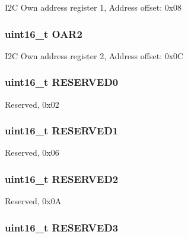 I2\-C Own address register 1, Address offset\-: 0x08 \hypertarget{struct_i2_c___type_def_a692c0f6e38cde9ec1c3c50c36aa79817}{
\subsubsection[{O\-A\-R2}]{ uint16\-\_\-t O\-A\-R2}}\label{struct_i2_c___type_def_a692c0f6e38cde9ec1c3c50c36aa79817}
I2\-C Own address register 2, Address offset\-: 0x0\-C \hypertarget{struct_i2_c___type_def_a149feba01f9c4a49570c6d88619f504f}{
\subsubsection[{R\-E\-S\-E\-R\-V\-E\-D0}]{\setlength{\rightskip}{0pt plus 5cm}uint16\-\_\-t R\-E\-S\-E\-R\-V\-E\-D0}}\label{struct_i2_c___type_def_a149feba01f9c4a49570c6d88619f504f}
Reserved, 0x02 \hypertarget{struct_i2_c___type_def_a8249a3955aace28d92109b391311eb30}{
\subsubsection[{R\-E\-S\-E\-R\-V\-E\-D1}]{\setlength{\rightskip}{0pt plus 5cm}uint16\-\_\-t R\-E\-S\-E\-R\-V\-E\-D1}}\label{struct_i2_c___type_def_a8249a3955aace28d92109b391311eb30}
Reserved, 0x06 \hypertarget{struct_i2_c___type_def_a5573848497a716a9947fd87487709feb}{
\subsubsection[{R\-E\-S\-E\-R\-V\-E\-D2}]{\setlength{\rightskip}{0pt plus 5cm}uint16\-\_\-t R\-E\-S\-E\-R\-V\-E\-D2}}\label{struct_i2_c___type_def_a5573848497a716a9947fd87487709feb}
Reserved, 0x0\-A \hypertarget{struct_i2_c___type_def_a6c3b31022e6f59b800e9f5cc2a89d54c}{
\subsubsection[{R\-E\-S\-E\-R\-V\-E\-D3}]{\setlength{\rightskip}{0pt plus 5cm}uint16\-\_\-t R\-E\-S\-E\-R\-V\-E\-D3}}\label{struct_i2_c___type_def_a6c3b31022e6f59b800e9f5cc2a89d54c}
